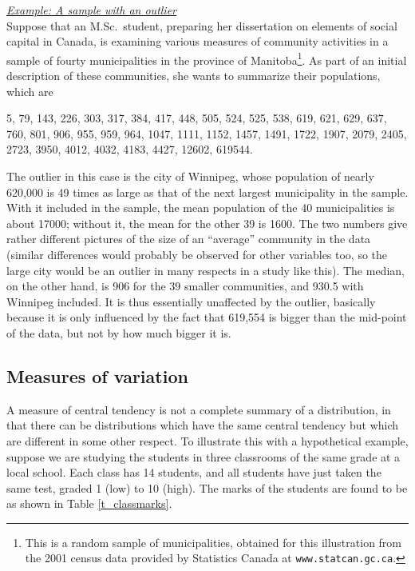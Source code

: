 \underline{\emph{Example: A sample with an outlier}}\\
Suppose that an M.Sc.\ student, preparing her dissertation on elements
of social capital in Canada, is examining various measures of community
activities in a sample of fourty municipalities in the province of
Manitoba\footnote{This is a random sample of municipalities,
obtained for this illustration from the 2001 census data provided by
Statistics Canada at \texttt{www.statcan.gc.ca}.}. As part of an initial
description of these communities, she wants to summarize their
populations, which are

5, 79, 143, 226, 303, 317, 384, 417, 448, 505, 524, 525, 538, 619, 621,
629, 637, 760, 801, 906, 955, 959, 964, 1047, 1111, 1152, 1457, 1491,
1722, 1907, 2079, 2405, 2723, 3950, 4012, 4032, 4183, 4427, 12602,
619544.

The outlier in this case is the city of Winnipeg, whose population of
nearly 620,000 is 49 times as large as that of the next largest
municipality in the sample. With it included in the sample, the mean
population of the 40 municipalities is about 17000; without it, the
mean for the other 39 is 1600. The two numbers give rather different
pictures of the size of an ``average'' community in the data (similar
differences would probably be observed for other variables too, so the
large city would be an outlier in many respects in a
study like this). The median, on the other hand, is 906 for the 39
smaller communities, and 930.5 with Winnipeg included. It is thus
essentially unaffected by the outlier, basically because it is only
influenced by the fact that 619,554 is bigger than the mid-point of the
data, but not by how much bigger it is.

\subsection{Measures of variation}
\label{ss_descr1_nums_variation}

A measure of central tendency is not a complete summary of a
distribution, in that there can be distributions which have the same
central tendency but which are different in some other respect. To
illustrate this with a hypothetical example,
suppose we are studying the students in three classrooms of the same
grade at a local school. Each class has 14 students, and all students
have just taken the same test, graded 1 (low) to 10 (high).
The marks of the students are found to be as shown in Table
\ref{t_classmarks}.


